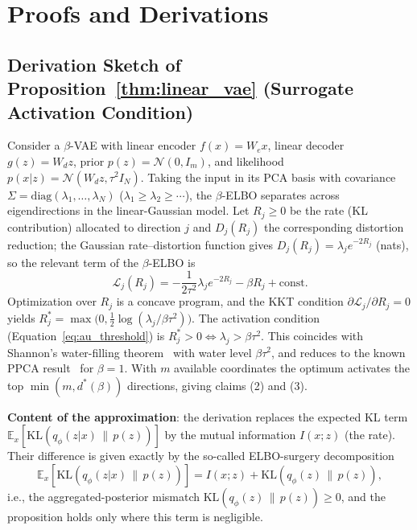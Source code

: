 \documentclass[make,article,submit,pdftex,moreauthors]{Definitions/mdpi}
\newcommand{\dstar}{d^{*}(\beta)}
\begin{document}
\appendixstart
\appendix

\section[\appendixname~\thesection]{Proofs and Derivations}\label{app:proofs}

\subsection[\appendixname~\thesubsection]{Derivation Sketch of Proposition~\ref{thm:linear_vae} (Surrogate Activation Condition)}

Consider a $\beta$-VAE with linear encoder $f(x) = W_e x$, linear decoder
$g(z) = W_d z$, prior $p(z) = \mathcal{N}(0, I_m)$, and likelihood
$p(x|z) = \mathcal{N}(W_d z, \tau^2 I_N)$.
Taking the input in its PCA basis with covariance
$\Sigma = \mathrm{diag}(\lambda_1, \ldots, \lambda_N)$
($\lambda_1 \geq \lambda_2 \geq \cdots$), the $\beta$-ELBO separates across
eigendirections in the linear-Gaussian model.
Let $R_j \geq 0$ be the rate (KL contribution) allocated to direction $j$
and $D_j(R_j)$ the corresponding distortion reduction; the Gaussian
rate--distortion function gives $D_j(R_j) = \lambda_j e^{-2R_j}$ (nats), so
the relevant term of the $\beta$-ELBO is
\begin{equation}
  \mathcal{L}_j(R_j) = -\frac{1}{2\tau^2}\lambda_j e^{-2R_j} - \beta R_j + \text{const.}
\end{equation}
Optimization over $R_j$ is a concave program, and the KKT condition
$\partial \mathcal{L}_j / \partial R_j = 0$ yields
$R_j^* = \max\bigl(0, \tfrac{1}{2}\log(\lambda_j / \beta\tau^2)\bigr)$.
The activation condition (Equation~\eqref{eq:au_threshold}) is
$R_j^* > 0 \iff \lambda_j > \beta\tau^2$.
This coincides with Shannon's water-filling theorem~\cite{cover2006elements}
with water level $\beta\tau^2$, and reduces to the known PPCA
result~\cite{tippingbishop1999ppca} for $\beta = 1$.
With $m$ available coordinates the optimum activates the top
$\min(m, \dstar)$ directions, giving claims (2) and (3).

\textbf{Content of the approximation}: the derivation replaces the expected
KL term $\mathbb{E}_x[\mathrm{KL}(q_\phi(z|x)\,\|\,p(z))]$ by the mutual
information $I(x; z)$ (the rate).
Their difference is given exactly by the so-called ELBO-surgery
decomposition~\cite{hoffman2016elbo}
\begin{equation}
  \mathbb{E}_x[\mathrm{KL}(q_\phi(z|x)\,\|\,p(z))]
  = I(x; z) + \mathrm{KL}(q_\phi(z)\,\|\,p(z)),
  \label{eq:elbo_surgery}
\end{equation}
i.e., the aggregated-posterior mismatch
$\mathrm{KL}(q_\phi(z)\,\|\,p(z)) \geq 0$, and the proposition holds only
where this term is negligible.
\end{document}
